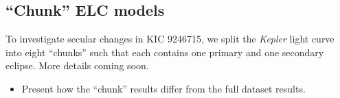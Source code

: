 \subsection{``Chunk'' ELC models}
To investigate secular changes in KIC 9246715, we split the \emph{Kepler} light curve into eight ``chunks'' such that each contains one primary and one secondary eclipse.
More details coming soon.

\begin{itemize}
\item Present how the ``chunk'' results differ from the full dataset results.
\end{itemize}